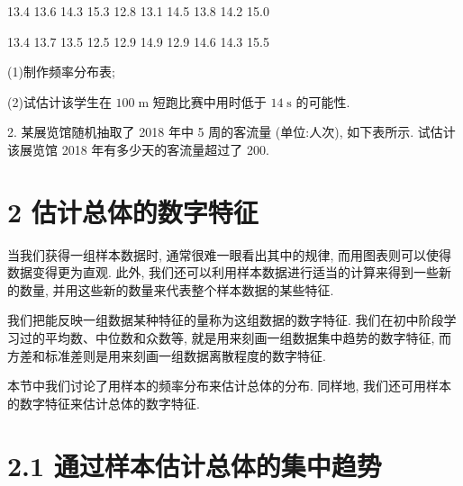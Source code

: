 \documentclass[10pt]{article}
\begin{document}
13.4 13.6 14.3 15.3 12.8 13.1 14.5 13.8 14.2 15.0

13.4 13.7 13.5 12.5 12.9 14.9 12.9 14.6 14.3 15.5

(1)制作频率分布表;

(2)试估计该学生在 \({100}\mathrm{\;m}\) 短跑比赛中用时低于 \({14}\mathrm{\;s}\) 的可能性.

2. 某展览馆随机抽取了 2018 年中 5 周的客流量 (单位:人次), 如下表所示. 试估计该展览馆 2018 年有多少天的客流量超过了 200.

\begin{center}
\end{center}



\section*{2 估计总体的数字特征}

当我们获得一组样本数据时, 通常很难一眼看出其中的规律, 而用图表则可以使得数据变得更为直观. 此外, 我们还可以利用样本数据进行适当的计算来得到一些新的数量, 并用这些新的数量来代表整个样本数据的某些特征.

我们把能反映一组数据某种特征的量称为这组数据的数字特征. 我们在初中阶段学习过的平均数、中位数和众数等, 就是用来刻画一组数据集中趋势的数字特征, 而方差和标准差则是用来刻画一组数据离散程度的数字特征.

本节中我们讨论了用样本的频率分布来估计总体的分布. 同样地, 我们还可用样本的数字特征来估计总体的数字特征.

\section*{2.1 通过样本估计总体的集中趋势}
\end{document}
